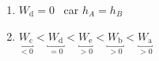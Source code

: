 \begin{enumerate}
    \item $W_{\text{d}}=0$ \ car $h_{A}=h_{B}$
      \item $\underbracket{W_{\text{c}}}_{<0}<
            \underbracket{W_{\text{d}}}_{=0}<
            \underbracket{W_{\text{e}}}_{>0}<
            \underbracket{W_{\text{b}}}_{>0}<
            \underbracket{W_{\text{a}}}_{>0}$
\end{enumerate}

